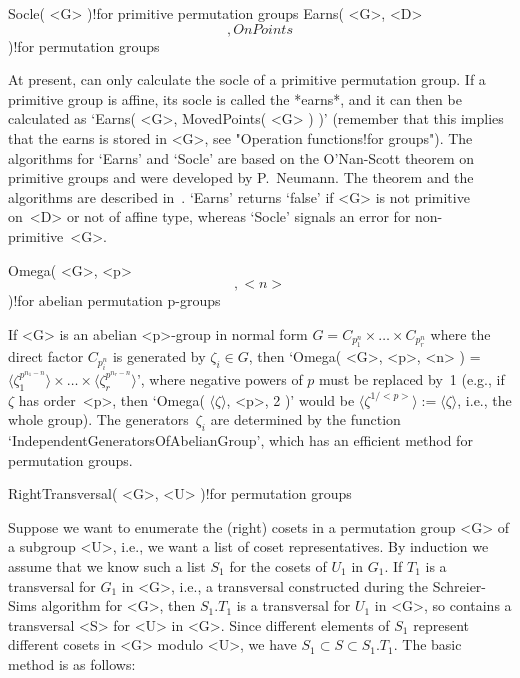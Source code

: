 \>Socle( <G> )!{for primitive permutation groups}
\>Earns( <G>, <D> \[, OnPoints \] )!{for permutation groups}

At   present,   {\GAP} can  only  calculate the    socle   of a primitive
permutation group. If  a primitive group is affine,  its socle  is called
the *earns*, and  it can then  be calculated as `Earns( <G>, MovedPoints(
<G> ) )' (remember that this implies that the earns is stored in <G>, see
"Operation functions!for groups"). The algorithms for `Earns' and `Socle'
are   based on  the O'Nan-Scott theorem    on  primitive groups and  were
developed  by  P.~Neumann. The theorem and   the algorithms are described
in~\cite{Neumann87}. `Earns'  returns  `false'  if <G>  is  not primitive
on~<D>  or not  of  affine type,  whereas `Socle'  signals  an error  for
non-primitive~<G>.

\>Omega( <G>, <p> \[, <n> \] )!{for abelian permutation p-groups}

If <G> is an abelian <p>-group in  normal form $G=C_{p^n_1} \times \ldots
\times  C_{p^n_r}$ where the  direct factor  $C_{p^n_i}$ is generated  by
$\zeta_i\in   G$,   then  `Omega(   <G>,      <p>,  <n>  )   =   $\langle
\zeta_1^{p^{n_1-n}}\rangle      \times              \ldots         \times
\langle\zeta_r^{p^{n_r-n}}\rangle$', where negative powers of $p$ must be
replaced     by~1  (e.g.,  if   $\zeta$    has  order~<p>, then   `Omega(
$\langle\zeta\rangle$,  <p>, 2 )' would be $\langle\zeta^{1/{<p>}}\rangle
:= \langle\zeta\rangle$, i.e., the whole group). The generators~$\zeta_i$
are   determined by  the  function `IndependentGeneratorsOfAbelianGroup',
which has an efficient method for permutation groups.

\>RightTransversal( <G>, <U> )!{for permutation groups} 

\danger Suppose we want to enumerate the  (right) cosets in a permutation
group <G>  of a     subgroup <U>,  i.e.,    we want   a list  of    coset
representatives.  By induction we  assume that we  know such a list $S_1$
for the cosets of $U_1$ in $G_1$. If $T_1$ is a  transversal for $G_1$ in
<G>, i.e., a  transversal constructed during  the Schreier-Sims algorithm
for <G>, then $S_1.T_1$ is a transversal for $U_1$ in  <G>, so contains a
transversal  <S>  for <U>  in <G>.  Since  different  elements   of $S_1$
represent  different cosets in  <G> modulo  <U>,  we have $S_1  \subset S
\subset S_1.T_1$. The basic method is as follows:

